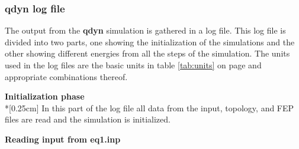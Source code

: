 \documentclass[a4paper,10pt]{article}
\begin{document}
\subsubsection{\textbf{qdyn} log file}
\label{subsubsec:qdynlogfiles}

The output from the \textbf{qdyn} simulation is gathered in a log
file. This log file is divided into two parts, one showing the
initialization of the simulations and the other showing different
energies from all the steps of the simulation. The units used in
the log files are the basic units in table \ref{tab:units} on page
\pageref{tab:units} and appropriate combinations thereof.

\textbf{Initialization phase}\\*[0.25cm] In this part of the log
file all data from the input, topology, and FEP files are read
and the simulation is initialized.

\textbf{Reading input from eq1.inp}
\end{document}
